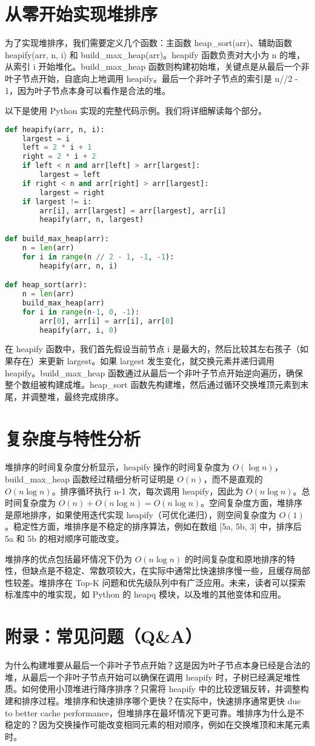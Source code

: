 \chapter{从零开始实现堆排序}
为了实现堆排序，我们需要定义几个函数：主函数 heap\_{}sort(arr)、辅助函数 heapify(arr, n, i) 和 build\_{}max\_{}heap(arr)。heapify 函数负责对大小为 n 的堆，从索引 i 开始堆化。build\_{}max\_{}heap 函数则构建初始堆，关键点是从最后一个非叶子节点开始，自底向上地调用 heapify。最后一个非叶子节点的索引是 n//2 - 1，因为叶子节点本身可以看作是合法的堆。\par
以下是使用 Python 实现的完整代码示例。我们将详细解读每个部分。\par
\begin{lstlisting}[language=python]
def heapify(arr, n, i):
    largest = i
    left = 2 * i + 1
    right = 2 * i + 2
    if left < n and arr[left] > arr[largest]:
        largest = left
    if right < n and arr[right] > arr[largest]:
        largest = right
    if largest != i:
        arr[i], arr[largest] = arr[largest], arr[i]
        heapify(arr, n, largest)

def build_max_heap(arr):
    n = len(arr)
    for i in range(n // 2 - 1, -1, -1):
        heapify(arr, n, i)

def heap_sort(arr):
    n = len(arr)
    build_max_heap(arr)
    for i in range(n-1, 0, -1):
        arr[0], arr[i] = arr[i], arr[0]
        heapify(arr, i, 0)
\end{lstlisting}
在 heapify 函数中，我们首先假设当前节点 i 是最大的，然后比较其左右孩子（如果存在）来更新 largest。如果 largest 发生变化，就交换元素并递归调用 heapify。build\_{}max\_{}heap 函数通过从最后一个非叶子节点开始逆向遍历，确保整个数组被构建成堆。heap\_{}sort 函数先构建堆，然后通过循环交换堆顶元素到末尾，并调整堆，最终完成排序。\par
\chapter{复杂度与特性分析}
堆排序的时间复杂度分析显示，heapify 操作的时间复杂度为 $O(\log{n})$，build\_{}max\_{}heap 函数经过精细分析可证明是 $O(n)$，而不是直观的 $O(n\log{n})$。排序循环执行 n-1 次，每次调用 heapify，因此为 $O(n\log{n})$。总时间复杂度为 $O(n) + O(n\log{n}) = O(n\log{n})$。空间复杂度方面，堆排序是原地排序，如果使用迭代实现 heapify（可优化递归），则空间复杂度为 $O(1)$。稳定性方面，堆排序是不稳定的排序算法，例如在数组 [5a, 5b, 3] 中，排序后 5a 和 5b 的相对顺序可能改变。\par
堆排序的优点包括最坏情况下仍为 $O(n \log{n})$ 的时间复杂度和原地排序的特性，但缺点是不稳定、常数项较大，在实际中通常比快速排序慢一些，且缓存局部性较差。堆排序在 Top-K 问题和优先级队列中有广泛应用。未来，读者可以探索标准库中的堆实现，如 Python 的 heapq 模块，以及堆的其他变体和应用。\par
\chapter{附录：常见问题（Q\&{}A）}
为什么构建堆要从最后一个非叶子节点开始？这是因为叶子节点本身已经是合法的堆，从最后一个非叶子节点开始可以确保在调用 heapify 时，子树已经满足堆性质。如何使用小顶堆进行降序排序？只需将 heapify 中的比较逻辑反转，并调整构建和排序过程。堆排序和快速排序哪个更快？在实际中，快速排序通常更快 due to better cache performance，但堆排序在最坏情况下更可靠。堆排序为什么是不稳定的？因为交换操作可能改变相同元素的相对顺序，例如在交换堆顶和末尾元素时。\par
